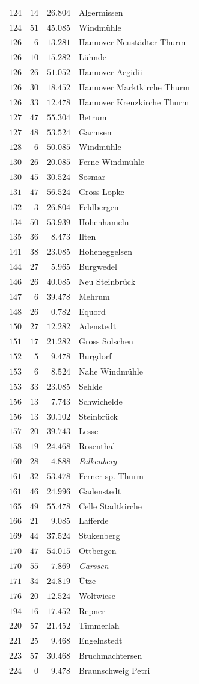 \begin{longtable}{@{}rrrp{.61\linewidth}@{}}
\(124\)&\(14\)&\(26.804\)&\raggedright Algermissen\tabularnewline
\(124\)&\(51\)&\(45.085\)&\raggedright Windmühle\tabularnewline
\(126\)&\(6\)&\(13.281\)&\raggedright Hannover Neustädter Thurm\tabularnewline
\(126\)&\(10\)&\(15.282\)&\raggedright Lühnde\tabularnewline
\(126\)&\(26\)&\(51.052\)&\raggedright Hannover Aegidii\tabularnewline
\(126\)&\(30\)&\(18.452\)&\raggedright Hannover Marktkirche Thurm\tabularnewline
\(126\)&\(33\)&\(12.478\)&\raggedright Hannover Kreuzkirche Thurm\tabularnewline
\(127\)&\(47\)&\(55.304\)&\raggedright Betrum\tabularnewline
\(127\)&\(48\)&\(53.524\)&\raggedright Garmsen\tabularnewline
\(128\)&\(6\)&\(50.085\)&\raggedright Windmühle\tabularnewline
\(130\)&\(26\)&\(20.085\)&\raggedright Ferne Windmühle\tabularnewline
\(130\)&\(45\)&\(30.524\)&\raggedright Sosmar\tabularnewline
\(131\)&\(47\)&\(56.524\)&\raggedright Gross Lopke\tabularnewline
\(132\)&\(3\)&\(26.804\)&\raggedright Feldbergen\tabularnewline
\(134\)&\(50\)&\(53.939\)&\raggedright Hohenhameln\tabularnewline
\(135\)&\(36\)&\(8.473\)&\raggedright Ilten\tabularnewline
\(141\)&\(38\)&\(23.085\)&\raggedright Hoheneggelsen\tabularnewline
\(144\)&\(27\)&\(5.965\)&\raggedright Burgwedel\tabularnewline
\(146\)&\(26\)&\(40.085\)&\raggedright Neu Steinbrück\tabularnewline
\(147\)&\(6\)&\(39.478\)&\raggedright Mehrum\tabularnewline
\(148\)&\(26\)&\(0.782\)&\raggedright Equord\tabularnewline
\(150\)&\(27\)&\(12.282\)&\raggedright Adenstedt\tabularnewline
\(151\)&\(17\)&\(21.282\)&\raggedright Gross Solschen\tabularnewline
\(152\)&\(5\)&\(9.478\)&\raggedright Burgdorf\tabularnewline
\(153\)&\(6\)&\(8.524\)&\raggedright Nahe Windmühle\tabularnewline
\(153\)&\(33\)&\(23.085\)&\raggedright Sehlde\tabularnewline
\(156\)&\(13\)&\(7.743\)&\raggedright Schwichelde\tabularnewline
\(156\)&\(13\)&\(30.102\)&\raggedright Steinbrück\tabularnewline
\(157\)&\(20\)&\(39.743\)&\raggedright Lesse\tabularnewline
\(158\)&\(19\)&\(24.468\)&\raggedright Rosenthal\tabularnewline
\(160\)&\(28\)&\(4.888\)&\raggedright \textit{Falkenberg}\tabularnewline
\(161\)&\(32\)&\(53.478\)&\raggedright Ferner sp. Thurm\tabularnewline
\(161\)&\(46\)&\(24.996\)&\raggedright Gadenstedt\tabularnewline
\(165\)&\(49\)&\(55.478\)&\raggedright Celle Stadtkirche\tabularnewline
\(166\)&\(21\)&\(9.085\)&\raggedright Lafferde\tabularnewline
\(169\)&\(44\)&\(37.524\)&\raggedright Stukenberg\tabularnewline
\(170\)&\(47\)&\(54.015\)&\raggedright Ottbergen\tabularnewline
\(170\)&\(55\)&\(7.869\)&\raggedright \textit{Garssen}\tabularnewline
\(171\)&\(34\)&\(24.819\)&\raggedright Ütze\tabularnewline
\(176\)&\(20\)&\(12.524\)&\raggedright Woltwiese\tabularnewline
\(194\)&\(16\)&\(17.452\)&\raggedright Repner\tabularnewline
\(220\)&\(57\)&\(21.452\)&\raggedright Timmerlah\tabularnewline
\(221\)&\(25\)&\(9.468\)&\raggedright Engelnstedt\tabularnewline
\(223\)&\(57\)&\(30.468\)&\raggedright Bruchmachtersen\tabularnewline
\(224\)&\(0\)&\(9.478\)&\raggedright Braunschweig Petri\tabularnewline
\end{longtable}
\endgroup
